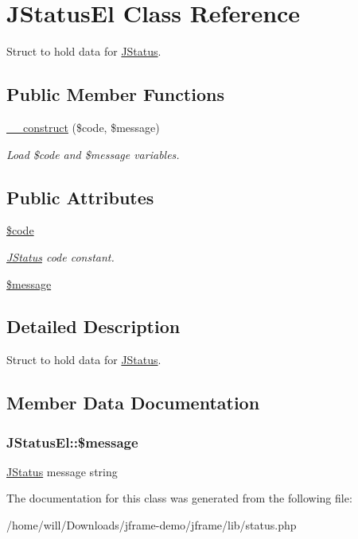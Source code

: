 \hypertarget{classJStatusEl}{\section{J\-Status\-El Class Reference}
\label{classJStatusEl}
}


Struct to hold data for \hyperlink{classJStatus}{J\-Status}.  


\subsection*{Public Member Functions}
\begin{DoxyCompactItemize}
\item 
\hypertarget{classJStatusEl_aca77530cea4d9e7800b15f2e4c24d833}{\hyperlink{classJStatusEl_aca77530cea4d9e7800b15f2e4c24d833}{\-\_\-\-\_\-construct} (\$code, \$message)}\label{classJStatusEl_aca77530cea4d9e7800b15f2e4c24d833}

\begin{DoxyCompactList}\small\item\em Load \$code and \$message variables. \end{DoxyCompactList}\end{DoxyCompactItemize}
\subsection*{Public Attributes}
\begin{DoxyCompactItemize}
\item 
\hypertarget{classJStatusEl_a33dd09d2855247f27226f4999abdf615}{\hyperlink{classJStatusEl_a33dd09d2855247f27226f4999abdf615}{\$code}}\label{classJStatusEl_a33dd09d2855247f27226f4999abdf615}

\begin{DoxyCompactList}\small\item\em \hyperlink{classJStatus}{J\-Status} code constant. \end{DoxyCompactList}\item 
\hyperlink{classJStatusEl_aa2b4cc89885a7847d88b6f9e194f3066}{\$message}
\end{DoxyCompactItemize}


\subsection{Detailed Description}
Struct to hold data for \hyperlink{classJStatus}{J\-Status}. 

\subsection{Member Data Documentation}
\hypertarget{classJStatusEl_aa2b4cc89885a7847d88b6f9e194f3066}{
\subsubsection[{\$message}]{\setlength{\rightskip}{0pt plus 5cm}J\-Status\-El\-::\$message}}\label{classJStatusEl_aa2b4cc89885a7847d88b6f9e194f3066}
\hyperlink{classJStatus}{J\-Status} message string 

The documentation for this class was generated from the following file\-:\begin{DoxyCompactItemize}
\item 
/home/will/\-Downloads/jframe-\/demo/jframe/lib/status.\-php\end{DoxyCompactItemize}
